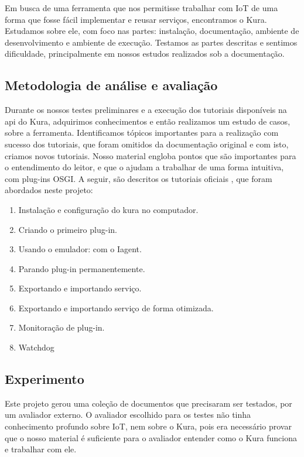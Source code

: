 
Em busca de uma ferramenta que nos permitisse trabalhar com IoT de uma forma que fosse fácil implementar e reusar serviços, encontramos o Kura. Estudamos sobre ele, com foco nas partes: instalação, documentação, ambiente de desenvolvimento e ambiente de execução. Testamos as partes descritas e sentimos dificuldade, principalmente em nossos estudos realizados sob a documentação.

\subsection{Metodologia de análise e avaliação}\label{sec:metodologia}


Durante os nossos testes preliminares e a execução dos tutoriais disponíveis na api do Kura, adquirimos conhecimentos e então realizamos um estudo de casos, sobre a ferramenta. Identificamos tópicos importantes para a realização com sucesso dos tutoriais, que foram omitidos da documentação original e com isto, criamos novos tutoriais. Nosso material engloba pontos que são importantes para o entendimento do leitor, e que o ajudam a trabalhar de uma forma intuitiva, com plug-ins OSGI. A seguir, são descritos os tutoriais oficiais \cite{KuraDocumentation}, que foram abordados neste projeto:

\begin{enumerate}
  \item Instalação e configuração do kura no computador.
  \item Criando o primeiro plug-in.
  \item Usando o emulador: com o Iagent.
  \item Parando plug-in permanentemente.
  \item Exportando e importando serviço.
  \item Exportando e importando serviço de forma otimizada.
  \item Monitoração de plug-in.
  \item Watchdog
\end{enumerate}

\subsection{Experimento}


Este projeto gerou uma coleção de documentos que precisaram ser testados, por um avaliador externo. O avaliador escolhido para os testes não tinha conhecimento profundo sobre IoT, nem sobre o Kura, pois era necessário provar que o nosso material é suficiente para o avaliador entender como o Kura funciona e trabalhar com ele.

